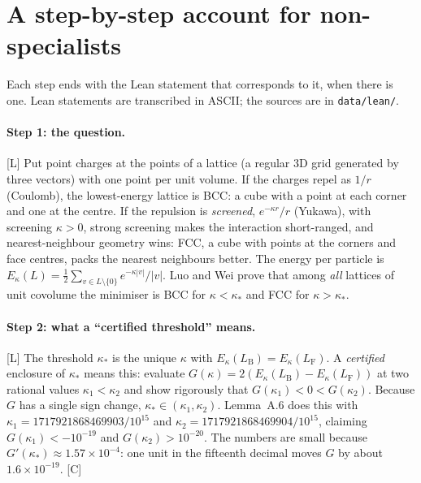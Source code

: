 \documentclass[11pt]{article}
\newcommand{\tier}[1]{\textsf{[#1]}}
\newcommand{\tL}{\tier{L}}
\newcommand{\tC}{\tier{C}}
\newcommand{\LF}{L_{\mathrm F}}
\newcommand{\LB}{L_{\mathrm B}}
\newcommand{\ks}{\kappa_*}
\begin{document}
\section{A step-by-step account for non-specialists}\label{sec:human}
Each step ends with the Lean statement that corresponds to it, when there is one. Lean statements are transcribed in ASCII; the sources are in
\texttt{data/lean/}.

\paragraph{Step 1: the question.}\tL{} Put point charges at the points of a lattice (a regular 3D grid generated by three vectors) with one point per unit volume. If
the charges repel as $1/r$ (Coulomb), the lowest-energy lattice is BCC: a cube with a point at each corner and one at the centre. If the repulsion is
\emph{screened}, $e^{-\kappa r}/r$ (Yukawa), with screening $\kappa>0$, strong screening makes the interaction short-ranged, and nearest-neighbour geometry wins: FCC, a
cube with points at the corners and face centres, packs the nearest neighbours better. The energy per particle is $E_\kappa(L)=\tfrac12\sum_{v\in L\setminus\{0\}}e^{-\kappa|v|}/|v|$.
Luo and Wei prove that among \emph{all} lattices of unit covolume the minimiser is BCC for $\kappa<\ks$ and FCC for $\kappa>\ks$.

\paragraph{Step 2: what a ``certified threshold'' means.}\tL{} The threshold $\ks$ is the unique $\kappa$ with $E_\kappa(\LB)=E_\kappa(\LF)$. A
\emph{certified} enclosure of $\ks$ means this: evaluate $G(\kappa)=2(E_\kappa(\LB)-E_\kappa(\LF))$ at two rational values $\kappa_1<\kappa_2$ and show rigorously that
$G(\kappa_1)<0<G(\kappa_2)$. Because $G$ has a single sign change, $\ks\in(\kappa_1,\kappa_2)$. Lemma~A.6 does this with
$\kappa_1=1717921868469903/10^{15}$ and $\kappa_2=1717921868469904/10^{15}$, claiming $G(\kappa_1)<-10^{-19}$ and $G(\kappa_2)>10^{-20}$.
The numbers are small because $G'(\ks)\approx1.57\times10^{-4}$: one unit in the fifteenth decimal moves $G$ by about $1.6\times10^{-19}$. \tC{}
\end{document}

